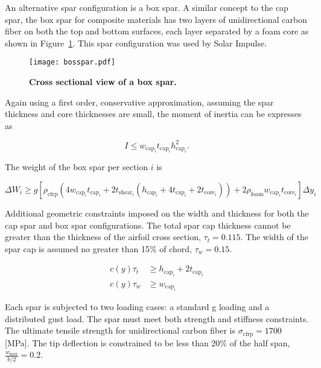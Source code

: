 \documentclass[]{aiaa-tc}%
\begin{document}
An alternative spar configuration is a box spar.  
A similar concept to the cap spar, the box spar for composite materials has two layers of unidirectional carbon fiber on both the top and bottom surfaces, each layer separated by a foam core as shown in Figure~\ref{f:boxspar}.
This spar configuration was used by Solar Impulse.\cite{zephyr_spar}

\begin{figure}[h!]
	\begin{center}
	\texttt{[image: bosspar.pdf]}
    \caption{\textbf{Cross sectional view of a box spar.}}
	\label{f:boxspar}
	\end{center}
\end{figure}

Again using a first order, conservative approximation, assuming the spar thickness and core thicknesses are small, the moment of inertia can be expresses as

\begin{equation}
    \label{e:moispar}
    I \leq w_{\text{cap}_i}t_{\text{cap}_i}h_{\text{cap}_i}^2.
\end{equation}

The weight of the box spar per section $i$ is 

\begin{equation}
    \label{e:sparmass}
    \Delta W_i \geq g [\rho_{\text{cfrp}} (4w_{\text{cap}_i}t_{\text{cap}_i} + 2t_{\mathrm{shear}_i}(h_{\mathrm{cap}_i} + 4t_{\mathrm{cap}_i} + 2t_{\mathrm{core}_i})) + 2\rho_{\mathrm{foam}} w_{\mathrm{cap}_i}t_{\mathrm{core}_i}] \Delta y_i
\end{equation}

Additional geometric constraints imposed on the width and thickness for both the cap spar and box spar configurations.  
The total spar cap thickness cannot be greater than the thickness of the airfoil cross section, $\tau_t = 0.115$.  
The width of the spar cap is assumed no greater than 15\% of chord, $\tau_w = 0.15$. 

\begin{align}
    c(y)\tau_t &\geq h_{\text{cap}_i} + 2t_{\text{cap}_i} \\
    c(y)\tau_w &\geq w_{\text{cap}_i} 
\end{align}

Each spar is subjected to two loading cases: a standard g loading and a distributed gust load.  The spar must meet both strength and stiffness constraints.
The ultimate tensile strength for unidirectional carbon fiber is $\sigma_{\text{cfrp}} = 1700$ [MPa].\cite{cfprop}
The tip deflection is constrained to be less than 20\% of the half span, $\frac{w_{\text{max}}}{b/2} = 0.2$.
\end{document}
